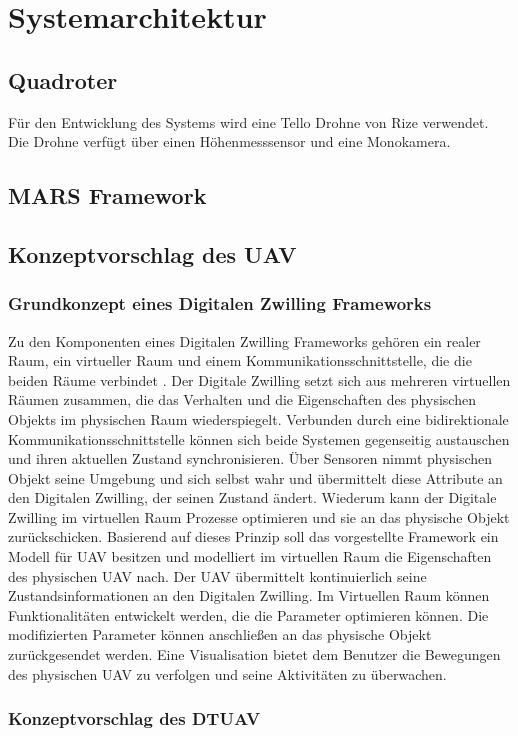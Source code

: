 \section{Systemarchitektur}

\subsection{Quadroter}
Für den Entwicklung des Systems wird eine Tello Drohne von Rize verwendet. Die Drohne verfügt über einen Höhenmesssensor und eine Monokamera. 




\subsection{MARS Framework}

\subsection{Konzeptvorschlag des UAV}

\subsubsection{Grundkonzept eines Digitalen Zwilling Frameworks}

Zu den Komponenten eines Digitalen Zwilling Frameworks gehören ein realer Raum, ein virtueller Raum und einem Kommunikationsschnittstelle, die die beiden Räume verbindet \cite{Gri2016OriOfTheDigTwiCon}. Der Digitale Zwilling setzt sich aus mehreren virtuellen Räumen zusammen, die das Verhalten und die Eigenschaften des physischen Objekts im physischen Raum wiederspiegelt.
Verbunden durch eine bidirektionale Kommunikationsschnittstelle können sich beide Systemen gegenseitig austauschen und ihren aktuellen Zustand synchronisieren. Über Sensoren nimmt physischen Objekt seine Umgebung und sich selbst wahr und übermittelt diese Attribute an den Digitalen Zwilling, der seinen Zustand ändert. Wiederum kann der Digitale Zwilling im virtuellen Raum Prozesse optimieren und sie an das physische Objekt zurückschicken.
Basierend auf dieses Prinzip soll das vorgestellte Framework ein Modell für UAV besitzen und modelliert im virtuellen Raum die Eigenschaften des physischen UAV nach. Der UAV übermittelt kontinuierlich seine Zustandsinformationen an den Digitalen Zwilling.
Im Virtuellen Raum können Funktionalitäten entwickelt werden, die die Parameter optimieren können. Die modifizierten Parameter können anschließen an das physische Objekt zurückgesendet werden. Eine Visualisation bietet dem Benutzer die Bewegungen des physischen UAV zu verfolgen und seine Aktivitäten zu überwachen.





\subsubsection{Konzeptvorschlag des DTUAV}

